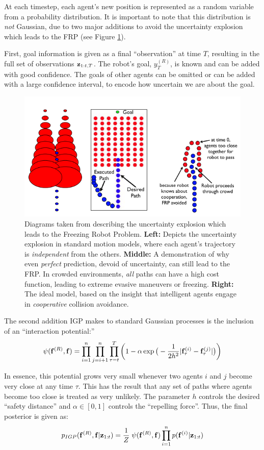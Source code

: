 \documentclass[a4paper,11pt,headings=small]{article}
\begin{document}
At each timestep, each agent's new position is represented as a random variable from a probability distribution. It is important to note that this distribution is \emph{not} Gaussian, due to two major additions to avoid the uncertainty explosion which leads to the FRP (see Figure \ref{uncertainty}).

First, goal information is given as a final ``observation'' at time $T$, resulting in the full set of observations $\mathbf{z}_{1:t,T}$. The robot's goal, $y_T^{(R)}$, is known and can be added with good confidence. The goals of other agents can be omitted or can be added with a large confidence interval, to encode how uncertain we are about the goal.

\begin{figure}[h]
\centering
\includegraphics[width=.75\textwidth]{uncertainty-explosion.png}
\caption{Diagrams taken from \cite{Trautman2010} describing the uncertainty explosion which leads to the Freezing Robot Problem. \textbf{Left:} Depicts the uncertainty explosion in standard motion models, where each agent's trajectory is \emph{independent} from the others. \textbf{Middle:} A demonstration of why even \emph{perfect} prediction, devoid of uncertainty, can still lead to the FRP. In crowded environments, \emph{all} paths can have a high cost function, leading to extreme evasive maneuvers or freezing. \textbf{Right:} The ideal model, based on the insight that intelligent agents engage in \emph{cooperative} collision avoidance.}
\label{uncertainty}
\end{figure}

The second addition IGP makes to standard Gaussian processes is the inclusion of an ``interaction potential:''
$$ \psi(\mathbf{f}^{(R)},\mathbf{f}) = \prod_{i=1}^n \prod_{j=i+1}^n \prod_{\tau=t}^T \left( 1 - \alpha \exp\big(-\frac{1}{2h^2}|\mathbf{f}^{(i)}_{\tau} - \mathbf{f}^{(j)}_{\tau}|\big) \right)$$

In essence, this potential grows very small whenever two agents $i$ and $j$ become very close at any time $\tau$. This has the result that any set of paths where agents become too close is treated as very unlikely. The parameter $h$ controls the desired ``safety distance'' and $\alpha \in [0, 1]$ controls the ``repelling force''. Thus, the final posterior is given as:
$$ p_{IGP}(\mathbf{f}^{(R)},\mathbf{f} | \mathbf{z}_{1:t}) = \frac{1}{Z} \; \psi(\mathbf{f}^{(R)},\mathbf{f}) \prod_{i=1}^n p(\mathbf{f}^{(i)} | \mathbf{z}_{1:t}) $$
\end{document}
